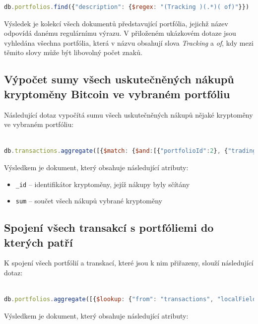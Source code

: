 \documentclass[12pt, a4paper]{article}
\begin{document}
\begin{lstlisting}[language=JavaScript]
db.portfolios.find({"description": {$regex: "(Tracking )(.*)( of)"}})
\end{lstlisting}

Výsledek je kolekcí všech dokumentů představující portfólia, jejichž název odpovídá danému regulárnímu výrazu. V přiloženém ukázkovém dotaze jsou vyhledána všechna portfólia, která v názvu obsahují slova \textit{Tracking} a \textit{of}, kdy mezi těmito slovy může být libovolný počet znaků.

\subsection{Výpočet sumy všech uskutečněných nákupů kryptoměny Bitcoin ve vybraném portfóliu}
Následující dotaz vypočítá sumu všech uskutečněných nákupů nějaké kryptoměny ve vybraném portfóliu:

\begin{lstlisting}[language=JavaScript]

db.transactions.aggregate([{$match: {$and:[{"portfolioId":2}, {"tradingPair.symbol": "btc"}, {"sell": {$exists: false}}]}}, {$group: {_id: "$tradingPair.symbol", sum: {$sum: "$size"}}}])

\end{lstlisting}
Výsledkem je dokument, který obsahuje následující atributy: 

\begin{itemize}
    \item \texttt{_id} -- identifikátor kryptoměny, jejíž nákupy byly sčítány
    \item \texttt{sum} -- součet všech nákupů vybrané kryptoměny
\end{itemize}


\subsection{Spojení všech transakcí s portfóliemi do kterých patří}
K spojení všech portfólií a transkací, které jsou k nim přiřazeny, slouží následující dotaz:

\begin{lstlisting}[language=JavaScript]

db.portfolios.aggregate([{$lookup: {"from": "transactions", "localField": "_id", "foreignField": "portfolioId", "as": "transactions"}}, {$project: {"portfolio_name":"$name", "transactions":"$transactions"}}])

\end{lstlisting}
Výsledkem je dokument, který obsahuje následující atributy: 
\end{document}
